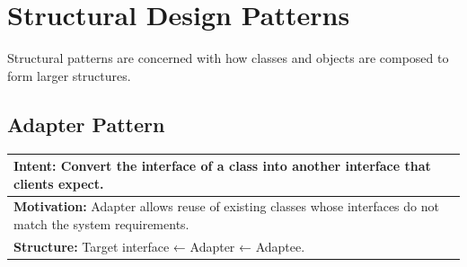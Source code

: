 \documentclass[12pt,a4paper]{article}
\begin{document}
\section{Structural Design Patterns}
\label{sec:structural-patterns}

Structural patterns are concerned with how classes and objects are composed to form larger structures.

\subsection{Adapter Pattern}
\label{subsec:adapter}

\begin{tabular}{p{}}
    \hline
    \rowcolor{lightgray}
    \textbf{Intent:} Convert the interface of a class into another interface that clients expect. \\
    \hline
    \textbf{Motivation:} Adapter allows reuse of existing classes whose interfaces do not match the system requirements. \\
    \hline
    \textbf{Structure:} Target interface ← Adapter ← Adaptee. \\
    \hline
\end{tabular}

\vspace{1em}
\end{document}
